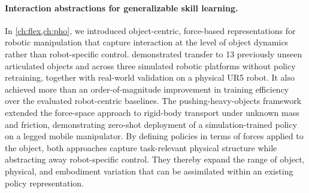 \paragraph{Interaction abstractions for generalizable skill learning.}
In \cref{ch:flex,ch:pho}, we introduced object-centric, force-based representations for robotic manipulation that capture interaction at the level of object dynamics rather than robot-specific control. \FLEX{} demonstrated transfer to 13 previously unseen articulated objects and across three simulated robotic platforms without policy retraining, together with real-world validation on a physical UR5 robot. It also achieved more than an order-of-magnitude improvement in training efficiency over the evaluated robot-centric baselines. The pushing-heavy-objects framework extended the force-space approach to rigid-body transport under unknown mass and friction, demonstrating zero-shot deployment of a simulation-trained policy on a legged mobile manipulator. By defining policies in terms of forces applied to the object, both approaches capture task-relevant physical structure while abstracting away robot-specific control. They thereby expand the range of object, physical, and embodiment variation that can be assimilated within an existing policy representation.
